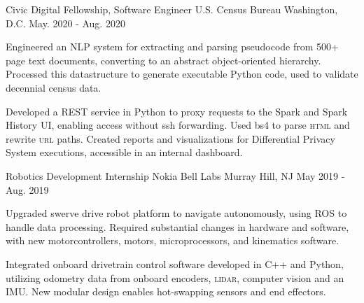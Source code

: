 \begin{cventries}
  \cventry
  {Civic Digital Fellowship, Software Engineer} %
  {U.S. Census Bureau} %
  {Washington, D.C.} %
  {May. 2020 - Aug. 2020} %
  {
    \begin{cvitems} %
      \item {Engineered an NLP system for extracting and parsing pseudocode from 500+ page text documents, converting to an abstract object-oriented hierarchy. Processed this datastructure to generate executable Python code, used to validate decennial census data.}
      \item {Developed a REST service in Python to proxy requests to the Spark and Spark History UI, enabling access without ssh forwarding. Used bs4 to parse \textsc{html} and rewrite \textsc{url} paths. Created reports and visualizations for Differential Privacy System executions, accessible in an internal dashboard.}
    \end{cvitems}
  }

  \cventry
  {Robotics Development Internship} %
  {Nokia Bell Labs} %
  {Murray Hill, NJ} %
  {May 2019 - Aug. 2019} %
  {
    \begin{cvitems} %
      \item {Upgraded swerve drive robot platform to navigate autonomously, using ROS to handle data processing. Required substantial changes in hardware and software, with new motorcontrollers, motors, microprocessors, and kinematics software.}
      \item {Integrated onboard drivetrain control software developed in C++ and Python, utilizing odometry data from onboard encoders, \textsc{lidar}, computer vision and an IMU. New modular design enables hot-swapping sensors and end effectors.}
    \end{cvitems}
  }



\end{cventries}
